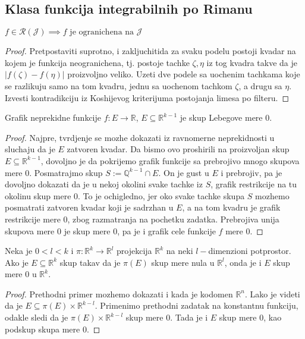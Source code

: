 \documentclass[a4paper,12pt]{article}
\newcommand{\QQ}{\mathbb{Q}}
\newcommand{\RR}{\mathbb{R}}
\newcommand{\psj}{\subseteq}
\begin{document}
\subsection{Klasa funkcija integrabilnih po Rimanu}

\begin{lema}
	\( f \in \mathcal R (\mathcal J) \implies f \text{ je ogranichena na } \mathcal J \) 
\end{lema}
\begin{proof}
	Pretpostaviti suprotno, i zakljuchitida za svaku podelu postoji kvadar na kojem je funkcija
	neogranichena, tj. postoje tachke $\zeta, \eta$ iz tog kvadra takve da je \( |f(\zeta) - f(\eta)| \) 
	proizvoljno veliko. Uzeti dve podele sa uochenim tachkama koje se razlikuju samo na tom kvadru,
	jednu sa uochenom tachkom $\zeta$, a drugu sa $\eta$. Izvesti kontradikciju iz Koshijevog kriterijuma
	postojanja limesa po filteru.
\end{proof}

\begin{pr}
	Grafik neprekidne funkcije $f: E \to \RR$, $E \psj \RR^{k-1}$ je skup Lebegove mere $0$.
\end{pr}
\begin{proof}
	Najpre, tvrdjenje se mozhe dokazati iz ravnomerne neprekidnosti u sluchaju da je $E$ zatvoren kvadar.
	Da bismo ovo proshirili na proizvoljan skup $E\psj \RR^{k-1}$, dovoljno je da pokrijemo grafik funkcije
	sa prebrojivo mnogo skupova mere $0$. Posmatrajmo skup $S:= \QQ^{k-1}\cap E$. On je gust u $E$ i prebrojiv,
	pa je dovoljno dokazati da je u nekoj okolini svake tachke iz $S$, grafik restrikcije
	na tu okolinu skup mere $0$. To je ochigledno, jer oko svake tachke skupa $S$ mozhemo posmatrati zatvoren
	kvadar koji je sadrzhan u $E$, a na tom kvadru je grafik restrikcije mere $0$, zbog razmatranja na pochetku 
	zadatka. Prebrojiva unija skupova mere $0$ je skup mere $0$, pa je i grafik cele funkcije $f$ mere $0$.
\end{proof}

\begin{pr}
	Neka je $0 < l < k$ i $\pi: \RR^k\to \RR^l$ projekcija $\RR^k$ na neki $l-$dimenzioni potprostor.
	Ako je $E\psj \RR^k$ skup takav da je $\pi(E)$ skup mere nula u $\RR^l$, onda je i $E$ skup mere $0$
	u $\RR^k$.
\end{pr}
\begin{proof}
	Prethodni primer mozhemo dokazati i kada je kodomen $\RR^n$. Lako je videti da je \( E\psj \pi(E)\times \RR^{k-l} \).
	Primenimo prethodni zadatak na konstantnu funkciju, odakle sledi da je $\pi(E)\times \RR^{k-l}$ skup mere $0$.
	Tada je i $E$ skup mere $0$, kao podskup skupa mere $0$.
\end{proof}
\end{document}
